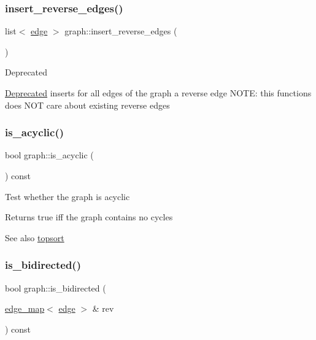 \subsubsection{\texorpdfstring{insert\+\_\+reverse\+\_\+edges()}{insert\_reverse\_edges()}}
{\footnotesize\ttfamily list$<$ \mbox{\hyperlink{classedge}{edge}} $>$ graph\+::insert\+\_\+reverse\+\_\+edges (\begin{DoxyParamCaption}{ }\end{DoxyParamCaption})}

\begin{DoxyRefDesc}{Deprecated}
\item[\mbox{\hyperlink{deprecated__deprecated000006}{Deprecated}}]inserts for all edges of the graph a reverse edge N\+O\+TE\+: this functions does N\+OT care about existing reverse edges \end{DoxyRefDesc}
\mbox{\label{classgraph_a9b500cb72826fe5bbefa8c71bc4642fa}} 
\subsubsection{\texorpdfstring{is\+\_\+acyclic()}{is\_acyclic()}}
{\footnotesize\ttfamily bool graph\+::is\+\_\+acyclic (\begin{DoxyParamCaption}{ }\end{DoxyParamCaption}) const}

Test whether the graph is acyclic

\begin{DoxyReturn}{Returns}
true iff the graph contains no cycles 
\end{DoxyReturn}
\begin{DoxySeeAlso}{See also}
\mbox{\hyperlink{classtopsort}{topsort}} 
\end{DoxySeeAlso}
\mbox{\label{classgraph_a8014a8073dd640c91cbd4fc1fb6e6071}} 
\subsubsection{\texorpdfstring{is\+\_\+bidirected()}{is\_bidirected()}}
{\footnotesize\ttfamily bool graph\+::is\+\_\+bidirected (\begin{DoxyParamCaption}\item[{\mbox{\hyperlink{classedge__map}{edge\+\_\+map}}$<$ \mbox{\hyperlink{classedge}{edge}} $>$ \&}]{rev }\end{DoxyParamCaption}) const}

